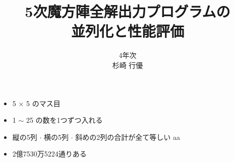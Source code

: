 \documentclass[a4paper,landscape,25pt]{foils}
\title{5次魔方陣全解出力プログラムの \\ 並列化と性能評価}
\author{4年次 \\ 杉崎 行優}
\begin{document}
\maketitle

\begin{itemize}
\item 5 $\times$ 5 のマス目
\item 1 $\sim$ 25 の数を1つずつ入れる
\item 縦の5列 $\cdot$ 横の5列 $\cdot$ 斜めの2列の合計が全て等しい
aa
\end{itemize}


\begin{itemize}
\item 2億7530万5224通りある
\end{itemize}
\end{document}
